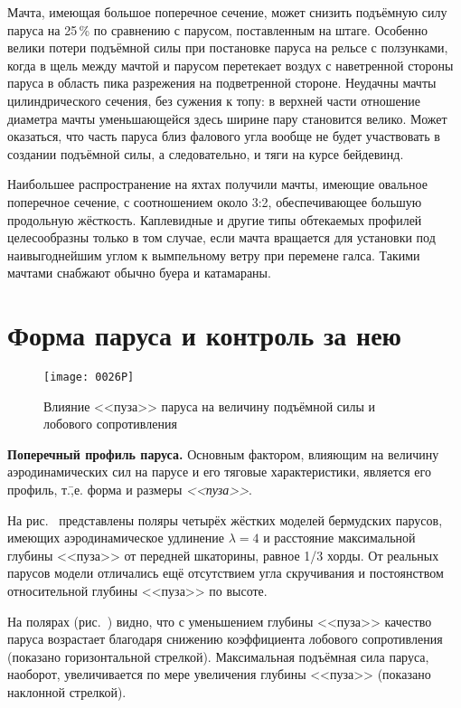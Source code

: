 Мачта, имеющая большое поперечное сечение, может снизить подъёмную
силу паруса на 25\,\% по сравнению с парусом, поставленным на
штаге. Особенно велики потери подъёмной силы при постановке паруса на
рельсе с ползунками, когда в щель между мачтой и парусом перетекает
воздух с наветренной стороны паруса в область пика разрежения на
подветренной стороне. Неудачны мачты цилиндрического сечения, без
сужения к топу: в верхней части отношение диаметра мачты уменьшающейся
здесь ширине пару становится велико. Может оказаться, что часть паруса
близ фалового угла вообще не будет участвовать в создании подъёмной
силы, а следовательно, и тяги на курсе бейдевинд.

Наибольшее распространение на яхтах получили мачты, имеющие овальное
поперечное сечение, с соотношением около 3:2, обеспечивающее большую
продольную жёсткость. Каплевидные и другие типы обтекаемых профилей
целесообразны только в том случае, если мачта вращается для установки
под наивыгоднейшим углом к вымпельному ветру при перемене
галса. Такими мачтами снабжают обычно буера и катамараны.

\section{Форма паруса и контроль за нею}

\begin{figure}[htb]
  \centering
  \texttt{[image: 0026P]}
  \caption{Влияние <<пуза>> паруса на величину подъёмной силы и лобового сопротивления}
  \label{fig:26}
\end{figure}

\textbf{Поперечный профиль паруса.}
Основным фактором, влияющим на величину аэродинамических сил на парусе
и его тяговые характеристики, является его профиль, т.\=,е. форма и
размеры \textit{<<пуза>>}.

На рис.~ представлены поляры четырёх жёстких моделей
бермудских парусов, имеющих аэродинамическое удлинение $\lambda = 4$ и
расстояние максимальной глубины <<пуза>> от передней шкаторины, равное
1/3 хорды. От реальных парусов модели отличались ещё отсутствием угла
скручивания и постоянством относительной глубины <<пуза>> по высоте.

На полярах (рис.~) видно, что с уменьшением глубины <<пуза>>
качество паруса возрастает благодаря снижению коэффициента лобового
сопротивления (показано горизонтальной стрелкой). Максимальная
подъёмная сила паруса, наоборот, увеличивается по мере увеличения
глубины <<пуза>> (показано наклонной стрелкой).

